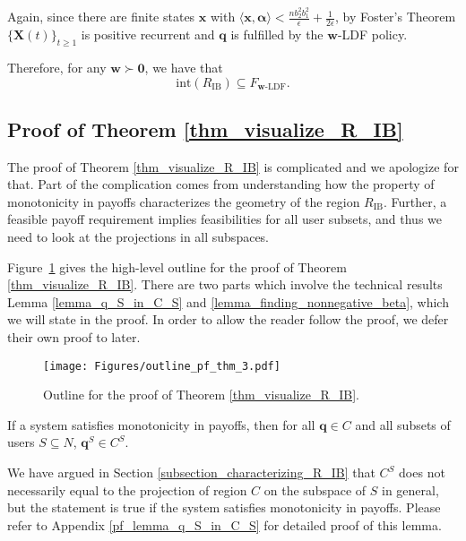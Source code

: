 \documentclass[prodmode,acmtompecs]{acmsmall}
\newcommand{\reqvec}{\mathbf{q}}
\newcommand{\ribvec}{\boldsymbol{\alpha}}
\newcommand{\feasibilityRegion}{F}
\newcommand{\fullUserSet}{N}
\begin{document}
Again, since there are finite states $\mathbf{x}$ with $\langle\mathbf{x}, \ribvec\rangle < \frac{n b_2^2 b_1^2}{\epsilon} + \frac{1}{2\epsilon}$, by Foster's Theorem $\{\mathbf{X}(t)\}_{t\geq 1}$ is positive recurrent and $\reqvec$ is fulfilled by the $\mathbf{w}$-LDF policy. 

Therefore, for any $\mathbf{w} \succ \mathbf{0}$, we have that
$$
\text{int}(R_\text{IB}) \subseteq \feasibilityRegion_{\mathbf{w}\text{-LDF}}. 
$$

\subsection{Proof of Theorem \ref{thm_visualize_R_IB}}
\label{appendix_pf_thm_visualize_R_IB}
The proof of Theorem \ref{thm_visualize_R_IB} is complicated and we apologize for that. Part of the complication comes from understanding how the property of monotonicity in payoffs characterizes the geometry of the region $R_\text{IB}$. Further, a feasible payoff requirement implies feasibilities for all user subsets, and thus we need to look at the projections in all subspaces. 

Figure~\ref{fig_outline_pf_thm_3} gives the high-level outline for the proof of Theorem \ref{thm_visualize_R_IB}. There are two parts which involve the technical results Lemma \ref{lemma_q_S_in_C_S} and \ref{lemma_finding_nonnegative_beta}, which we will state in the proof. In order to allow the reader follow the proof, we defer their own proof to later. 

\begin{figure}[htp]
  \centering
  \texttt{[image: Figures/outline\_pf\_thm\_3.pdf]}
  \caption{Outline for the proof of Theorem \ref{thm_visualize_R_IB}. }
  \label{fig_outline_pf_thm_3}
\end{figure}

\begin{lemma}
\label{lemma_q_S_in_C_S}
If a system satisfies monotonicity in payoffs, then for all $\reqvec \in C$ and all subsets of users $S\subseteq \fullUserSet$, $\reqvec^S \in C^S$. 
\end{lemma}

We have argued in Section \ref{subsection_characterizing_R_IB} that $C^S$ does not necessarily equal to the projection of region $C$ on the subspace of $S$ in general, but the statement is true if the system satisfies monotonicity in payoffs. Please refer to Appendix \ref{pf_lemma_q_S_in_C_S} for detailed proof of this lemma. 
\end{document}
